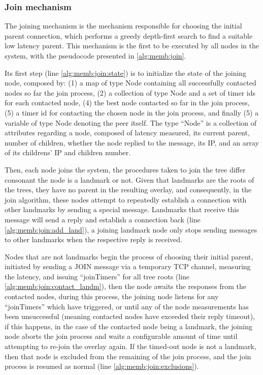 \subsubsection{Join mechanism}

The joining mechanism is the mechanism responsible for choosing the initial parent connection, which performs a greedy depth-first search to find a suitable low latency parent. This mechanism is the first to be executed by all nodes in the system, with the pseudocode presented in \ref{alg:memb:join}. 



Its first step (line \ref{alg:memb:join:state}) is to initialize the state of the joining node, composed by: (1) a map of type Node containing all successfully contacted nodes so far the join process, (2) a collection of type Node and a set of timer ids for each contacted node, (4) the best node contacted so far in the join process, (5) a timer id for contacting the chosen node in the join process, and finally (5) a variable of type Node denoting the peer itself. The type ``Node'' is a collection of attributes regarding a node, composed of latency measured, its current parent, number of children, whether the node replied to the message, its IP, and an array of its childrens' IP and children number.

Then, each node joins the system, the procedures taken to join the tree differ consonant the node is a landmark or not. Given that landmarks are the roots of the trees, they have no parent in the resulting overlay, and consequently, in the join algorithm, these nodes attempt to repeatedly establish a connection with other landmarks by sending a special message. Landmarks that receive this message will send a reply and establish a connection back (line \ref{alg:memb:join:add_land}), a joining landmark node only stops sending messages to other landmarks when the respective reply is received.

Nodes that are not landmarks begin the process of choosing their initial parent, initiated by sending a JOIN message via a temporary TCP channel, measuring the latency, and issuing ``joinTimers'' for all tree roots (line \ref{alg:memb:join:contact_landm}), then the node awaits the responses from the contacted nodes, during this process, the joining node listens for any ``joinTimers'' which have triggered, or until any of the node measurements has been unsuccessful (meaning contacted nodes have exceeded their reply timeout), if this happens, in the case of the contacted node being a landmark, the joining node aborts the join process and waits a configurable amount of time until attempting to re-join the overlay again. If the timed-out node is not a landmark, then that node is excluded from the remaining of the join process, and the join process is resumed as normal (line \ref{alg:memb:join:exclusions}).

